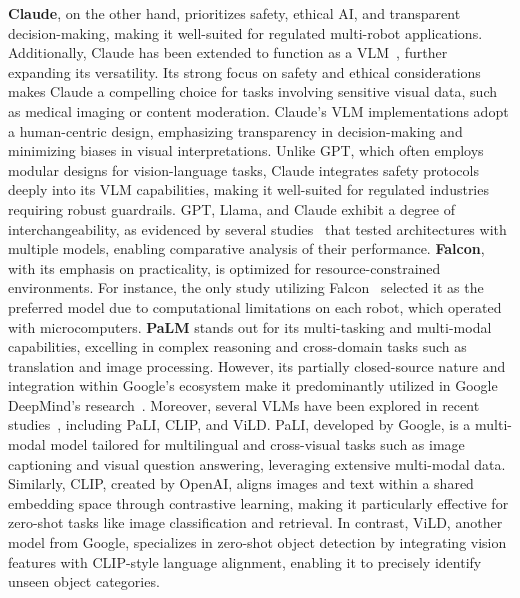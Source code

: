 \textbf{Claude}, on the other hand, prioritizes safety, ethical AI, and transparent decision-making, making it well-suited for regulated multi-robot applications. Additionally, Claude has been extended to function as a VLM~\cite{garg_foundation_2024}, further expanding its versatility. Its strong focus on safety and ethical considerations makes Claude a compelling choice for tasks involving sensitive visual data, such as medical imaging or content moderation. Claude's VLM implementations adopt a human-centric design, emphasizing transparency in decision-making and minimizing biases in visual interpretations. Unlike GPT, which often employs modular designs for vision-language tasks, Claude integrates safety protocols deeply into its VLM capabilities, making it well-suited for regulated industries requiring robust guardrails.
GPT, Llama, and Claude exhibit a degree of interchangeability, as evidenced by several studies~\cite{kannan_smart-llm_2024, wang_safe_2024, venkatesh_zerocap_2024, wang_dart-llm_2024} that tested architectures with multiple models, enabling comparative analysis of their performance.
\textbf{Falcon}, with its emphasis on practicality, is optimized for resource-constrained environments. For instance, the only study utilizing Falcon~\cite{lykov_llm-mars_2023} selected it as the preferred model due to computational limitations on each robot, which operated with microcomputers.
\textbf{PaLM} stands out for its multi-tasking and multi-modal capabilities, excelling in complex reasoning and cross-domain tasks such as translation and image processing. However, its partially closed-source nature and integration within Google's ecosystem make it predominantly utilized in Google DeepMind's research~\cite{ahn_vader_2024}.
Moreover, several VLMs have been explored in recent studies~\cite{ahn_vader_2024}, including PaLI, CLIP, and ViLD. PaLI, developed by Google, is a multi-modal model tailored for multilingual and cross-visual tasks such as image captioning and visual question answering, leveraging extensive multi-modal data. Similarly, CLIP, created by OpenAI, aligns images and text within a shared embedding space through contrastive learning, making it particularly effective for zero-shot tasks like image classification and retrieval. In contrast, ViLD, another model from Google, specializes in zero-shot object detection by integrating vision features with CLIP-style language alignment, enabling it to precisely identify unseen object categories.

